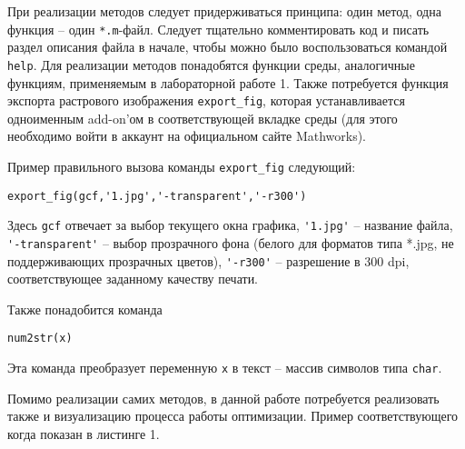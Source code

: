 \documentclass[a4paper,12pt]{article}
\begin{document}
При реализации методов следует придерживаться принципа: один метод, одна функция -- один \lstinline[style=Matlab-editor]{*.m}-файл.
Следует тщательно комментировать код и писать раздел описания файла в начале, чтобы можно было воспользоваться командой \lstinline[style=Matlab-editor]{help}. Для реализации методов понадобятся функции среды, аналогичные функциям, применяемым в лабораторной работе 1. Также потребуется функция экспорта растрового изображения
\lstinline[style=Matlab-editor]{export_fig}, которая устанавливается одноименным add-on'ом в соответствующей вкладке среды (для этого необходимо войти в аккаунт на официальном сайте Mathworks).

Пример правильного вызова команды \lstinline[style=Matlab-editor]{export_fig} следующий:

 \lstinline[style=Matlab-editor]{export_fig(gcf,'1.jpg','-transparent','-r300')}
 
 Здесь \lstinline[style=Matlab-editor]{gcf} отвечает за выбор текущего окна графика, \lstinline[style=Matlab-editor]{'1.jpg'} -- название файла, \lstinline[style=Matlab-editor]{'-transparent'} -- выбор прозрачного фона (белого для форматов типа *.jpg, не поддерживающих прозрачных цветов), \lstinline[style=Matlab-editor]{'-r300'} -- разрешение в 300 dpi, соответствующее заданному качеству печати.
 
 Также понадобится команда 
 
  \lstinline[style=Matlab-editor]{num2str(x)}
  
  Эта команда преобразует переменную  \lstinline[style=Matlab-editor]{x} в текст -- массив символов типа \lstinline[style=Matlab-editor]{char}.

Помимо реализации самих методов, в данной работе потребуется реализовать также и визуализацию процесса работы оптимизации. Пример соответствующего когда показан в листинге 1.
\end{document}
